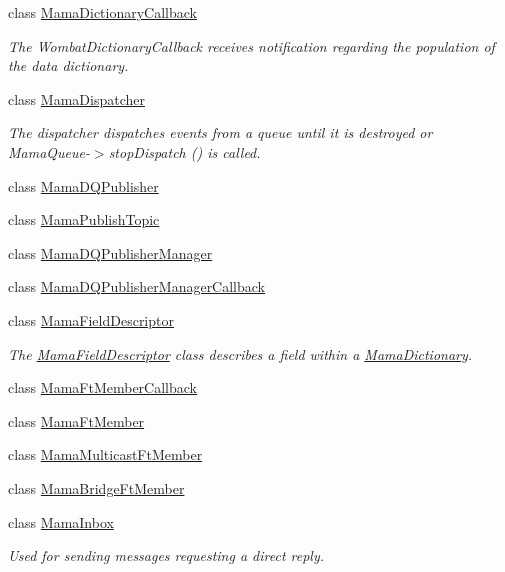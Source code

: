 \begin{DoxyCompactItemize}
class \hyperlink{classWombat_1_1MamaDictionaryCallback}{MamaDictionaryCallback}
\begin{DoxyCompactList}\small\item\em The {\ttfamily WombatDictionaryCallback} receives notification regarding the population of the data dictionary. \item\end{DoxyCompactList}\item 
class \hyperlink{classWombat_1_1MamaDispatcher}{MamaDispatcher}
\begin{DoxyCompactList}\small\item\em The dispatcher dispatches events from a queue until it is destroyed or MamaQueue-\/$>$stopDispatch () is called. \item\end{DoxyCompactList}\item 
class \hyperlink{classWombat_1_1MamaDQPublisher}{MamaDQPublisher}
\item 
class \hyperlink{classWombat_1_1MamaPublishTopic}{MamaPublishTopic}
\item 
class \hyperlink{classWombat_1_1MamaDQPublisherManager}{MamaDQPublisherManager}
\item 
class \hyperlink{classWombat_1_1MamaDQPublisherManagerCallback}{MamaDQPublisherManagerCallback}
\item 
class \hyperlink{classWombat_1_1MamaFieldDescriptor}{MamaFieldDescriptor}
\begin{DoxyCompactList}\small\item\em The {\ttfamily \hyperlink{classWombat_1_1MamaFieldDescriptor}{MamaFieldDescriptor}} class describes a field within a {\ttfamily \hyperlink{classWombat_1_1MamaDictionary}{MamaDictionary}}. \item\end{DoxyCompactList}\item 
class \hyperlink{classWombat_1_1MamaFtMemberCallback}{MamaFtMemberCallback}
\item 
class \hyperlink{classWombat_1_1MamaFtMember}{MamaFtMember}
\item 
class \hyperlink{classWombat_1_1MamaMulticastFtMember}{MamaMulticastFtMember}
\item 
class \hyperlink{classWombat_1_1MamaBridgeFtMember}{MamaBridgeFtMember}
\item 
class \hyperlink{classWombat_1_1MamaInbox}{MamaInbox}
\begin{DoxyCompactList}\small\item\em Used for sending messages requesting a direct reply. \item\end{DoxyCompactList}\item 

\end{DoxyCompactItemize}
